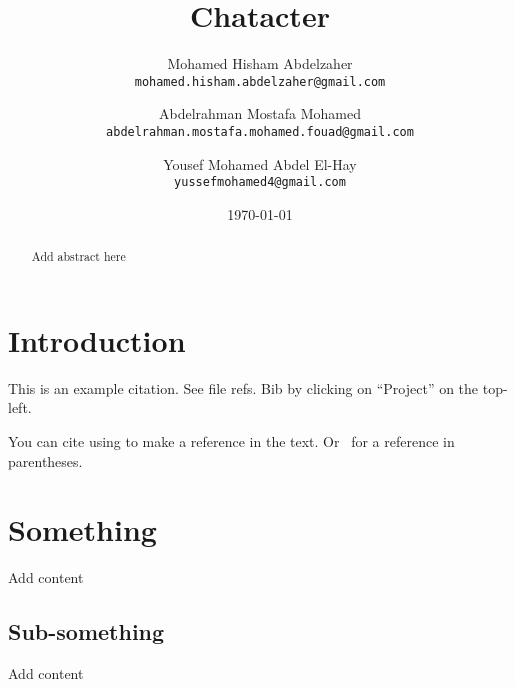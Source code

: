 \documentclass[a4paper, one column, aas_macros]{article}
\title{Chatacter}
\author{
    Mohamed Hisham Abdelzaher\\
    \texttt{mohamed.hisham.abdelzaher@gmail.com}
    \and
    Abdelrahman Mostafa Mohamed\\
    \texttt{abdelrahman.mostafa.mohamed.fouad@gmail.com}
    \and
    Yousef Mohamed Abdel El-Hay\\
    \texttt{yussefmohamed4@gmail.com}
}
\date{\today}
\begin{document}
    \maketitle

    \begin{abstract}
        Add abstract here
    \end{abstract}

    \section{Introduction}\label{sec:introduction}

    This is an example citation.
    See file refs.
    Bib by clicking on ``Project'' on the top-left.

    You can cite using \citet{Claydon17}to make a reference in the text.
    Or~\citep{Claydon17} for a reference in parentheses.

    \section{Something}\label{sec:something}

    Add content

    \subsection{Sub-something}\label{subsec:sub-something}

    Add content
\end{document}
